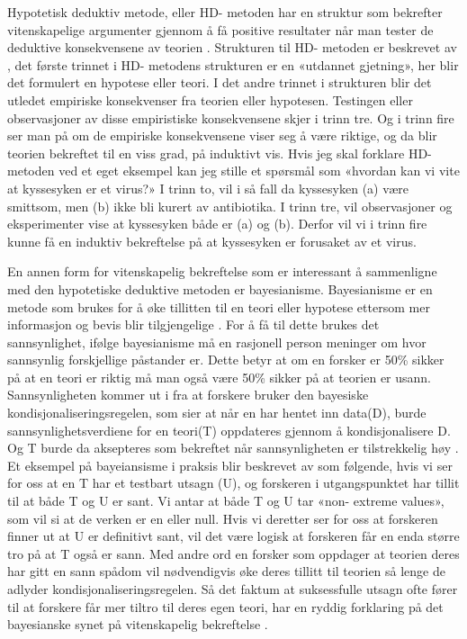 \documentclass[
]{book}
\begin{document}
Hypotetisk deduktiv metode, eller HD- metoden har en struktur som bekrefter vitenskapelige argumenter gjennom å få positive resultater når man tester de deduktive konsekvensene av teorien \citet{hempel1966}.
Strukturen til HD- metoden er beskrevet av \citet{hempel1966}, det første trinnet i HD- metodens strukturen er en «utdannet gjetning», her blir det formulert en hypotese eller teori.
I det andre trinnet i strukturen blir det utledet empiriske konsekvenser fra teorien eller hypotesen.
Testingen eller observasjoner av disse empiristiske konsekvensene skjer i trinn tre.
Og i trinn fire ser man på om de empiriske konsekvensene viser seg å være riktige, og da blir teorien bekreftet til en viss grad, på induktivt vis.
Hvis jeg skal forklare HD- metoden ved et eget eksempel kan jeg stille et spørsmål som «hvordan kan vi vite at kyssesyken er et virus?»
I trinn to, vil i så fall da kyssesyken (a) være smittsom, men (b) ikke bli kurert av antibiotika.
I trinn tre, vil observasjoner og eksperimenter vise at kyssesyken både er (a) og (b).
Derfor vil vi i trinn fire kunne få en induktiv bekreftelse på at kyssesyken er forusaket av et virus.

En annen form for vitenskapelig bekreftelse som er interessant å sammenligne med den hypotetiske deduktive metoden er bayesianisme.
Bayesianisme er en metode som brukes for å øke tillitten til en teori eller hypotese ettersom mer informasjon og bevis blir tilgjengelige \citet{okasha2016}.
For å få til dette brukes det sannsynlighet, ifølge bayesianisme må en rasjonell person meninger om hvor sannsynlig forskjellige påstander er.
Dette betyr at om en forsker er 50\% sikker på at en teori er riktig må man også være 50\% sikker på at teorien er usann.
Sannsynligheten kommer ut i fra at forskere bruker den bayesiske kondisjonaliseringsregelen, som sier at når en har hentet inn data(D), burde sannsynlighetsverdiene for en teori(T) oppdateres gjennom å kondisjonalisere D.
Og T burde da aksepteres som bekreftet når sannsynligheten er tilstrekkelig høy \citet{okasha2016}.
Et eksempel på bayeiansisme i praksis blir beskrevet av \citet{okasha2016} som følgende, hvis vi ser for oss at en T har et testbart utsagn (U), og forskeren i utgangspunktet har tillit til at både T og U er sant.
Vi antar at både T og U tar «non- extreme values», som vil si at de verken er en eller null.
Hvis vi deretter ser for oss at forskeren finner ut at U er definitivt sant, vil det være logisk at forskeren får en enda større tro på at T også er sann.
Med andre ord en forsker som oppdager at teorien deres har gitt en sann spådom vil nødvendigvis øke deres tillitt til teorien så lenge de adlyder kondisjonaliseringsregelen.
Så det faktum at suksessfulle utsagn ofte fører til at forskere får mer tiltro til deres egen teori, har en ryddig forklaring på det bayesianske synet på vitenskapelig bekreftelse \citet{okasha2016}.
\end{document}
